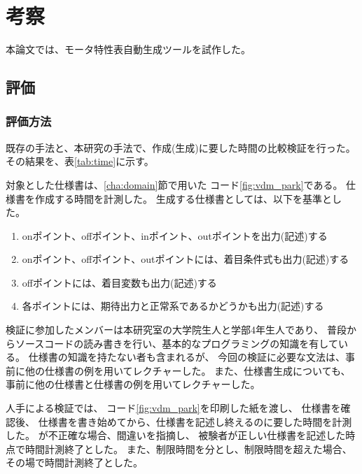 \chapter{考察}\label{cha:Discussion}
本論文では、モータ特性表自動生成ツールを試作した。

\section{評価}

\subsection{評価方法}
\newcommand{\mExist}{既存の手法}
\newcommand{\mExtend}{本研究の手法}
\newcommand{\mInput}{仕様書}
\newcommand{\mOutput}{仕様書}

\mExist{}と、\mExtend{}で、作成(生成)に要した時間の比較検証を行った。
その結果を、表\ref{tab:time}に示す。

対象とした\mInput{}は、\ref{cha:domain}節で用いた コード\ref{fig:vdm_park}である。
\mOutput{}を作成する時間を計測した。
生成する\mOutput{}としては、以下を基準とした。
\begin{enumerate}
  \item onポイント、offポイント、inポイント、outポイントを出力(記述)する
  \item onポイント、offポイント、outポイントには、着目条件式も出力(記述)する
  \item offポイントには、着目変数も出力(記述)する
  \item 各ポイントには、期待出力と正常系であるかどうかも出力(記述)する
\end{enumerate}

検証に参加したメンバーは本研究室の大学院生人と学部4年生人であり、
普段からソースコードの読み書きを行い、基本的なプログラミングの知識を有している。
\mInput{}の知識を持たない者も含まれるが、
今回の検証に必要な文法は、事前に他の\mInput{}の例を用いてレクチャーした。
また、\mOutput{}生成についても、事前に他の\mInput{}と\mOutput{}の例を用いてレクチャーした。

人手による検証では、
コード\ref{fig:vdm_park}を印刷した紙を渡し、
\mInput{}を確認後、
\mOutput{}を書き始めてから、\mOutput{}を記述し終えるのに要した時間を計測した。
が不正確な場合、間違いを指摘し、
被験者が正しい\mOutput{}を記述した時点で時間計測終了とした。
また、制限時間を分とし、制限時間を超えた場合、その場で時間計測終了とした。


